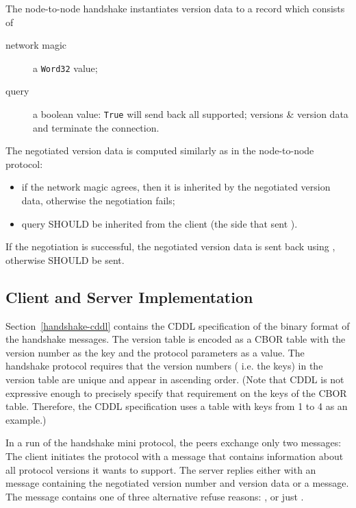 The node-to-node handshake instantiates version data to a record which consists
of
\begin{description}
  \item[network magic] a \texttt{Word32} value;
  \item[query] a boolean value: \texttt{True} will send back all supported;
    versions \& version data and terminate the connection.
\end{description}

The negotiated version data is computed similarly as in the node-to-node
protocol:
\begin{itemize}\label{alg:node-to-client-negotiation}
  \item if the network magic agrees, then it is inherited by the negotiated version
    data, otherwise the negotiation fails;
  \item query SHOULD be inherited from the client (the side that sent
    \MsgProposeVersions{}).
\end{itemize}
If the negotiation is successful, the negotiated version data is sent back
using \MsgAcceptVersion{}, otherwise \MsgRefuse{} SHOULD be sent.


\subsection{Client and Server Implementation}
Section~\ref{handshake-cddl} contains the CDDL specification of the binary format of the handshake messages.
The version table is encoded as a CBOR table with the version number as the key
and the protocol parameters as a value.
The handshake protocol requires that the version numbers ( i.e. the keys) in the version table are unique
and appear in ascending order.
(Note that CDDL is not expressive enough to precisely specify that requirement on the keys of the CBOR
table. Therefore, the CDDL specification uses a table with keys from 1 to 4 as an example.)

In a run of the handshake mini protocol, the peers exchange only two messages:
The client initiates the protocol with a \MsgProposeVersions{} message that
contains information about all protocol versions it wants to support. The
server replies either with an \MsgAcceptVersion{} message containing the
negotiated version number and version data or a \MsgRefuse{} message.
The \MsgRefuse{} message contains one of three alternative refuse reasons:
\VersionMismatch{}, \HandshakeDecodeError{} or just \Refused{}.

